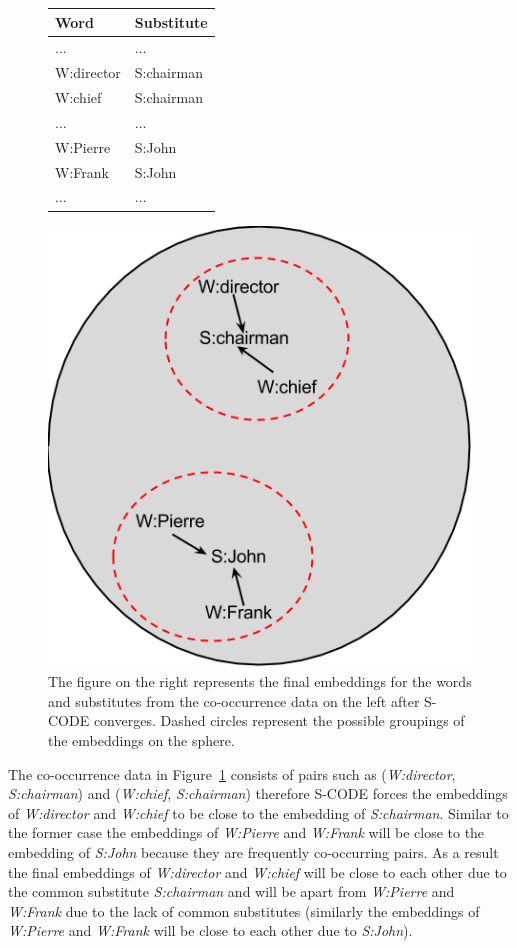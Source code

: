 \begin{figure}[ht]
\centering
  \begin{minipage}[c]{0.38\textwidth}
    \begin{tabular}{|l|l|}
    \hline
    \textbf{Word} & \textbf{Substitute} \\
    \hline
    $\hdots$&$\hdots$\\
    W:director & S:chairman \\
    W:chief & S:chairman \\
    $\hdots$&$\hdots$\\
    W:Pierre & S:John \\
    W:Frank & S:John \\
    $\hdots$&$\hdots$\\
    \hline
  \end{tabular}
  \end{minipage}
  \begin{minipage}[c]{0.48\textwidth}
    \includegraphics[height=.6\textwidth]{scode-ex.png}
  \end{minipage}
  \caption{The figure on the right represents the final embeddings for the
    words and substitutes from the co-occurrence data on the left after
    S-CODE converges.  Dashed circles represent the possible groupings
    of the embeddings on the sphere.}
  \label{fig:scodeexample}
\end{figure}

The co-occurrence data in Figure~\ref{fig:scodeexample} consists of
pairs such as (\textit{W:director}, \textit{S:chairman}) and
(\textit{W:chief}, \textit{S:chairman}) therefore S-CODE forces the
embeddings of \textit{W:director} and \textit{W:chief} to be close to
the embedding of \textit{S:chairman}.  Similar to the former case the
embeddings of \textit{W:Pierre} and \textit{W:Frank} will be close to
the embedding of \textit{S:John} because they are frequently
co-occurring pairs.  As a result the final embeddings of
\textit{W:director} and \textit{W:chief} will be close to each other
due to the common substitute \textit{S:chairman} and will be apart
from \textit{W:Pierre} and \textit{W:Frank} due to the lack of common
substitutes (similarly the embeddings of \textit{W:Pierre} and
\textit{W:Frank} will be close to each other due to \textit{S:John}).

